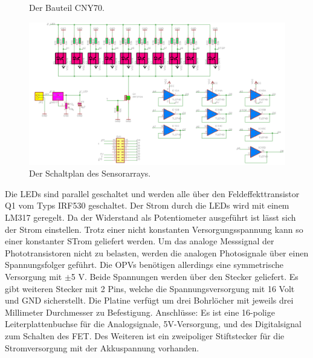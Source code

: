 \documentclass[a4paper,bibtotoc,oneside]{scrbook}
\begin{document}
\begin{figure}
\centering
\caption{Der Bauteil CNY70.} \label{cny}
\end{figure} 

\begin{figure}[htbp]
\centering
\includegraphics[width=125mm]{img/array.png}
\caption{Der Schaltplan des Sensorarrays.}\label{array}
\end{figure}
Die LEDs sind parallel geschaltet und werden alle über den Feldeffekttransistor Q1 vom Typs IRF530 \cite{irf} geschaltet.
Der Strom durch die LEDs wird mit einem LM317 geregelt. Da der Widerstand als Potentiometer ausgeführt ist lässt sich der Strom einstellen. Trotz einer nicht konstanten Versorgungsspannung kann so einer konstanter STrom geliefert werden. Um das analoge Messsignal der Phototransistoren nicht zu belasten, werden die analogen Photosignale über einen Spannungsfolger geführt. Die OPVs benötigen allerdings eine symmetrische Versorgung mit $\pm$5 V. Beide Spannungen werden über den Stecker geliefert.
Es gibt weiteren Stecker mit 2 Pins, welche die Spannungsversorgung mit 16 Volt und GND sicherstellt. 
Die Platine verfügt um drei Bohrlöcher mit jeweils drei Millimeter Durchmesser zu Befestigung.
Anschlüsse: Es ist eine 16-polige Leiterplattenbuchse für die Analogsignale, 5V-Versorgung, und des Digitalsignal zum Schalten des FET. Des Weiteren ist ein zweipoliger Stiftstecker für die Stromversorgung mit der Akkuspannung vorhanden.
\end{document}
